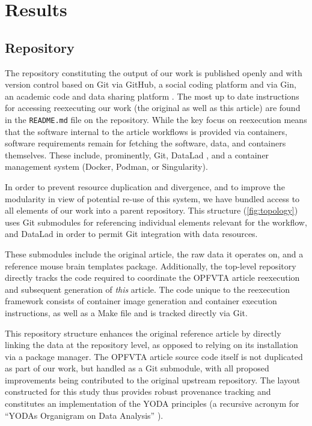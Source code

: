 \section{Results}

\subsection{Repository}

The repository constituting the output of our work is published openly and with version control based on Git \cite{git} via GitHub, a social coding platform \cite{me} and via Gin, an academic code and data sharing platform \cite{me-gin}.
The most up to date instructions for accessing reexecuting our work (the original as well as this article) are found in the \texttt{README.md} file on the repository.
While the key focus on reexecution means that the software internal to the article workflows is provided via containers, software requirements remain for fetching the software, data, and containers themselves.
These include, prominently, Git, DataLad \cite{datalad}, and a container management system (Docker, Podman, or Singularity).

In order to prevent resource duplication and divergence, and to improve the modularity in view of potential re-use of this system, we have bundled access to all elements of our work into a parent repository.
This structure (\cref{fig:topology}) uses Git submodules for referencing individual elements relevant for the workflow, and DataLad in order to permit Git integration with data resources.

These submodules include the original article, the raw data it operates on, and a reference mouse brain templates package.
Additionally, the top-level repository directly tracks the code required to coordinate the OPFVTA article reexecution and subsequent generation of \emph{this} article.
The code unique to the reexecution framework consists of container image generation and container execution instructions, as well as a Make file and is tracked directly via Git.

This repository structure enhances the original reference article by directly linking the data at the repository level, as opposed to relying on its installation via a package manager.
The OPFVTA article source code itself is not duplicated as part of our work, but handled as a Git submodule, with all proposed improvements being contributed to the original upstream repository.
The layout constructed for this study thus provides robust provenance tracking and constitutes an implementation of the YODA principles (a recursive acronym for “YODAs Organigram on Data Analysis” \cite{yoda}).

